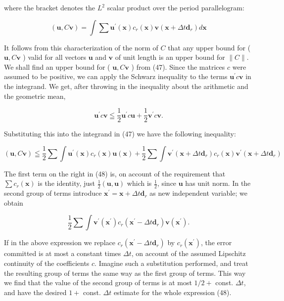 \documentclass[10pt]{article}
\begin{document}
where the bracket denotes the \(L^{2}\) scalar product over the period parallelogram:

\[
(\mathbf{u}, C \mathbf{v})=\int \sum \mathbf{u}^{\prime}(\mathbf{x}) c_{r}(\mathbf{x}) \mathbf{v}\left(\mathbf{x}+\Delta t \mathbf{d}_{r}\right) d \mathbf{x}
\]

It follows from this characterization of the norm of \(C\) that any upper bound for ( \(\mathbf{u}, C \mathbf{v}\) ) valid for all vectors \(\mathbf{u}\) and \(\mathbf{v}\) of unit length is an upper bound for \(\|C\|\). We shall find an upper bound for ( \(\mathbf{u}, C \mathbf{v}\) ) from (47). Since the matrices \(c\) were assumed to be positive, we can apply the Schwarz inequality to the terms \(\mathbf{u}^{\prime} c \mathbf{v}\) in the integrand. We get, after throwing in the inequality about the arithmetic and the geometric mean,

\[
\mathbf{u}^{\prime} c \mathbf{v} \leqq \frac{1}{2} \mathbf{u}^{\prime} c \mathbf{u}+\frac{1}{2} \mathbf{v}^{\prime} c \mathbf{v} .
\]

Substituting this into the integrand in (47) we have the following inequality:

\[
(\mathbf{u}, C \mathbf{v}) \leqq \frac{1}{2} \sum \int \mathbf{u}^{\prime}(\mathbf{x}) c_{r}(\mathbf{x}) \mathbf{u}(\mathbf{x})+\frac{1}{2} \sum \int \mathbf{v}^{\prime}\left(\mathbf{x}+\Delta t \mathbf{d}_{r}\right) c_{r}(\mathbf{x}) \mathbf{v}^{\prime}\left(\mathbf{x}+\Delta t \mathbf{d}_{r}\right)
\]

The first term on the right in (48) is, on account of the requirement that \(\sum c_{r}(\mathbf{x})\) is the identity, just \(\frac{1}{2}(\mathbf{u}, \mathbf{u})\) which is \(\frac{1}{2}\), since \(\mathbf{u}\) has unit norm. In the second group of terms introduce \(\mathbf{x}^{\prime}=\mathbf{x}+\Delta t \mathbf{d}_{r}\) as new independent variable; we obtain

\[
\frac{1}{2} \sum \int \mathbf{v}^{\prime}\left(\mathbf{x}^{\prime}\right) c_{r}\left(\mathbf{x}^{\prime}-\Delta t \mathbf{d}_{r}\right) \mathbf{v}\left(\mathbf{x}^{\prime}\right) .
\]

If in the above expression we replace \(c_{r}\left(\mathbf{x}^{\prime}-\Delta t \mathbf{d}_{r}\right)\) by \(c_{r}\left(\mathbf{x}^{\prime}\right)\), the error committed is at most a constant times \(\Delta t\), on account of the assumed Lipschitz continuity of the coefficients \(c\). Imagine such a substitution performed, and treat the resulting group of terms the same way as the first group of terms. This way we find that the value of the second group of terms is at most \(1 / 2+\) const. \(\Delta t\), and have the desired \(1+\) const. \(\Delta t\) estimate for the whole expression (48).
\end{document}
